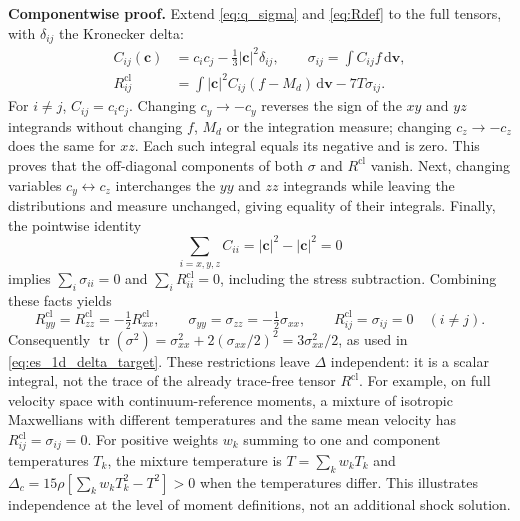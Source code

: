 \documentclass[lineno,paper]{JFM-FLM_Au}
\newenvironment{revision}{\begingroup\colorlet{shadecolor}{revisionyellow}\begin{shaded}}{\end{shaded}\endgroup}
\newenvironment{revision}{}{}
\newcommand{\dd}{\mathrm{d}}
\newcommand{\cl}{\mathrm{cl}}
\newcommand{\tr}{\operatorname{tr}}
\begin{document}
\begin{revision}
\textbf{Componentwise proof.} Extend \eqref{eq:q_sigma} and \eqref{eq:Rdef} to the full tensors, with $\delta_{ij}$ the Kronecker delta:
\begin{equation}
\begin{split}
 C_{ij}(\boldsymbol c)&=c_i c_j-\tfrac13|\boldsymbol c|^2\delta_{ij},
 \qquad \sigma_{ij}=\int C_{ij}f\,\dd\boldsymbol v,\\
 R^{\cl}_{ij}&=\int |\boldsymbol c|^2 C_{ij}(f-M_d)\,\dd\boldsymbol v
                 -7T\sigma_{ij}.
\end{split}
\label{eq:full_R_tensor}
\end{equation}
For $i\ne j$, $C_{ij}=c_i c_j$. Changing $c_y\to-c_y$ reverses the sign of the $xy$ and $yz$ integrands without changing $f$, $M_d$ or the integration measure; changing $c_z\to-c_z$ does the same for $xz$. Each such integral equals its negative and is zero. This proves that the off-diagonal components of both $\sigma$ and $R^{\cl}$ vanish. Next, changing variables $c_y\leftrightarrow c_z$ interchanges the $yy$ and $zz$ integrands while leaving the distributions and measure unchanged, giving equality of their integrals. Finally, the pointwise identity
\[
 \sum_{i=x,y,z} C_{ii}=|\boldsymbol c|^2-|\boldsymbol c|^2=0
\]
implies $\sum_i\sigma_{ii}=0$ and $\sum_i R^{\cl}_{ii}=0$, including the stress subtraction. Combining these facts yields
\begin{equation}
 R^{\cl}_{yy}=R^{\cl}_{zz}=-\tfrac12R^{\cl}_{xx},\qquad
 \sigma_{yy}=\sigma_{zz}=-\tfrac12\sigma_{xx},\qquad
 R^{\cl}_{ij}=\sigma_{ij}=0\quad(i\ne j).
 \label{eq:normal_shock_tensor_reduction}
\end{equation}
Consequently $\tr(\sigma^2)=\sigma_{xx}^2+2(\sigma_{xx}/2)^2=3\sigma_{xx}^2/2$, as used in \eqref{eq:es_1d_delta_target}. These restrictions leave $\Delta$ independent: it is a scalar integral, not the trace of the already trace-free tensor $R^{\cl}$. For example, on full velocity space with continuum-reference moments, a mixture of isotropic Maxwellians with different temperatures and the same mean velocity has $R^{\cl}_{ij}=\sigma_{ij}=0$. For positive weights $w_k$ summing to one and component temperatures $T_k$, the mixture temperature is $T=\sum_k w_kT_k$ and $\Delta_c=15\rho[\sum_k w_kT_k^2-T^2]>0$ when the temperatures differ. This illustrates independence at the level of moment definitions, not an additional shock solution.
\end{revision}
\end{document}
